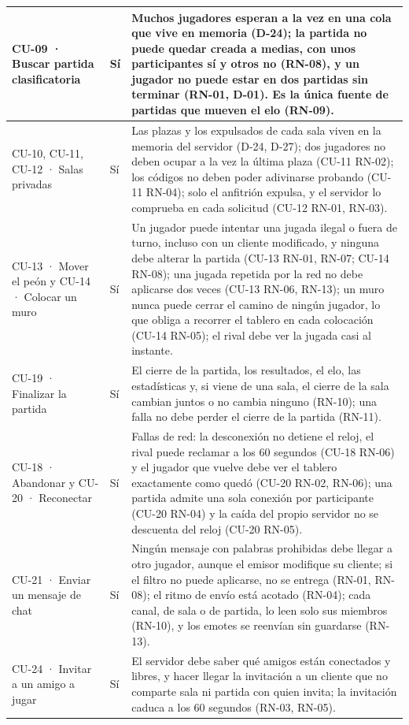 \documentclass[11pt,letterpaper]{article}
\begin{document}
\begin{xltabular}{\linewidth}{|p{4.6cm}|p{3.2cm}|Y|}
  CU-09 · Buscar partida clasificatoria & Sí & Muchos jugadores esperan a la vez en una cola que vive en memoria (D-24); la partida no puede quedar creada a medias, con unos participantes sí y otros no (RN-08), y un jugador no puede estar en dos partidas sin terminar (RN-01, D-01). Es la única fuente de partidas que mueven el elo (RN-09).\\\hline
  CU-10, CU-11, CU-12 · Salas privadas & Sí & Las plazas y los expulsados de cada sala viven en la memoria del servidor (D-24, D-27); dos jugadores no deben ocupar a la vez la última plaza (CU-11 RN-02); los códigos no deben poder adivinarse probando (CU-11 RN-04); solo el anfitrión expulsa, y el servidor lo comprueba en cada solicitud (CU-12 RN-01, RN-03).\\\hline
  CU-13 · Mover el peón y CU-14 · Colocar un muro & Sí & Un jugador puede intentar una jugada ilegal o fuera de turno, incluso con un cliente modificado, y ninguna debe alterar la partida (CU-13 RN-01, RN-07; CU-14 RN-08); una jugada repetida por la red no debe aplicarse dos veces (CU-13 RN-06, RN-13); un muro nunca puede cerrar el camino de ningún jugador, lo que obliga a recorrer el tablero en cada colocación (CU-14 RN-05); el rival debe ver la jugada casi al instante.\\\hline
  CU-19 · Finalizar la partida & Sí & El cierre de la partida, los resultados, el elo, las estadísticas y, si viene de una sala, el cierre de la sala cambian juntos o no cambia ninguno (RN-10); una falla no debe perder el cierre de la partida (RN-11).\\\hline
  CU-18 · Abandonar y CU-20 · Reconectar & Sí & Fallas de red: la desconexión no detiene el reloj, el rival puede reclamar a los 60 segundos (CU-18 RN-06) y el jugador que vuelve debe ver el tablero exactamente como quedó (CU-20 RN-02, RN-06); una partida admite una sola conexión por participante (CU-20 RN-04) y la caída del propio servidor no se descuenta del reloj (CU-20 RN-05).\\\hline
  CU-21 · Enviar un mensaje de chat & Sí & Ningún mensaje con palabras prohibidas debe llegar a otro jugador, aunque el emisor modifique su cliente; si el filtro no puede aplicarse, no se entrega (RN-01, RN-08); el ritmo de envío está acotado (RN-04); cada canal, de sala o de partida, lo leen solo sus miembros (RN-10), y los emotes se reenvían sin guardarse (RN-13).\\\hline
  CU-24 · Invitar a un amigo a jugar & Sí & El servidor debe saber qué amigos están conectados y libres, y hacer llegar la invitación a un cliente que no comparte sala ni partida con quien invita; la invitación caduca a los 60 segundos (RN-03, RN-05).\\\hline

\end{xltabular}
\end{document}
